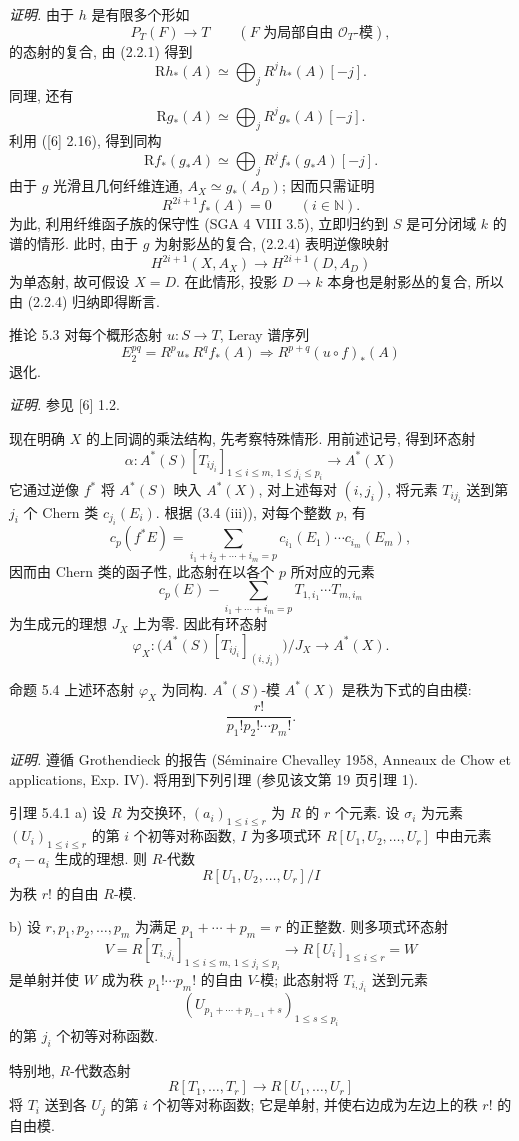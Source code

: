\emph{证明.} 由于 $h$ 是有限多个形如
\[
P_T(F)\to T\qquad(F\text{ 为局部自由 }\mathcal O_T\text{-模}),
\tag{Q}
\]
的态射的复合, 由 (2.2.1) 得到
\[
\mathrm Rh_*(A)\simeq\bigoplus_j R^jh_*(A)[-j].
\]
同理, 还有
\[
\mathrm Rg_*(A)\simeq\bigoplus_j R^jg_*(A)[-j].
\]
利用 ([6] 2.16), 得到同构
\[
\mathrm Rf_*(g_*A)\simeq\bigoplus_j R^j f_*(g_*A)[-j].
\]
由于 $g$ 光滑且几何纤维连通, $A_X\simeq g_*(A_D)$; 因而只需证明
\[
R^{2i+1}f_*(A)=0\qquad (i\in\mathbb N).
\tag{5.2.1}
\]
为此, 利用纤维函子族的保守性 (SGA 4 VIII 3.5), 立即归约到 $S$ 是可分闭域 $k$ 的谱的情形. 此时, 由于 $g$ 为射影丛的复合, (2.2.4) 表明逆像映射
\[
H^{2i+1}(X,A_X)\to H^{2i+1}(D,A_D)
\]
为单态射, 故可假设 $X=D$. 在此情形, 投影 $D\to k$ 本身也是射影丛的复合, 所以由 (2.2.4) 归纳即得断言.

\begin{statement}{推论 5.3}
对每个概形态射 $u:S\to T$, Leray 谱序列
\[
E_2^{pq}=R^p u_*\,R^q f_*(A)\Rightarrow R^{p+q}(u\circ f)_*(A)
\]
退化.
\end{statement}

\emph{证明.} 参见 [6] 1.2.

现在明确 $X$ 的上同调的乘法结构, 先考察特殊情形. 用前述记号, 得到环态射
\[
\alpha:A^*(S)[T_{ij_i}]_{1\le i\le m,\,1\le j_i\le p_i}\to A^*(X)
\]
它通过逆像 $f^*$ 将 $A^*(S)$ 映入 $A^*(X)$, 对上述每对 $(i,j_i)$, 将元素 $T_{ij_i}$ 送到第 $j_i$ 个 Chern 类 $c_{j_i}(E_i)$. 根据 (3.4 (iii)), 对每个整数 $p$, 有
\[
c_p(f^*E)=\sum_{i_1+i_2+\cdots+i_m=p}c_{i_1}(E_1)\cdots c_{i_m}(E_m),
\]
因而由 Chern 类的函子性, 此态射在以各个 $p$ 所对应的元素
\[
c_p(E)-\sum_{i_1+\cdots+i_m=p}T_{1,i_1}\cdots T_{m,i_m}
\]
为生成元的理想 $J_X$ 上为零. 因此有环态射
\[
\varphi_X:\bigl(A^*(S)[T_{ij_i}]_{(i,j_i)}\bigr)/J_X\to A^*(X).
\]

\begin{statement}{命题 5.4}
上述环态射 $\varphi_X$ 为同构. $A^*(S)$-模 $A^*(X)$ 是秩为下式的自由模:
\[
\frac{r!}{p_1!p_2!\cdots p_m!}.
\]
\end{statement}

\emph{证明.} 遵循 Grothendieck 的报告 (Séminaire Chevalley 1958, Anneaux de Chow et applications, Exp. IV). 将用到下列引理 (参见该文第 19 页引理 1).

\begin{statement}{引理 5.4.1}
a) 设 $R$ 为交换环, $(a_i)_{1\le i\le r}$ 为 $R$ 的 $r$ 个元素. 设 $\sigma_i$ 为元素 $(U_i)_{1\le i\le r}$ 的第 $i$ 个初等对称函数, $I$ 为多项式环 $R[U_1,U_2,\ldots,U_r]$ 中由元素 $\sigma_i-a_i$ 生成的理想. 则 $R$-代数
\[
R[U_1,U_2,\ldots,U_r]/I
\]
为秩 $r!$ 的自由 $R$-模.

b) 设 $r,p_1,p_2,\ldots,p_m$ 为满足 $p_1+\cdots+p_m=r$ 的正整数. 则多项式环态射
\[
V=R[T_{i,j_i}]_{1\le i\le m,\,1\le j_i\le p_i}
\longrightarrow R[U_i]_{1\le i\le r}=W
\]
是单射并使 $W$ 成为秩 $p_1!\cdots p_m!$ 的自由 $V$-模; 此态射将 $T_{i,j_i}$ 送到元素
\[
(U_{p_1+\cdots+p_{i-1}+s})_{1\le s\le p_i}
\]
的第 $j_i$ 个初等对称函数.

特别地, $R$-代数态射
\[
R[T_1,\ldots,T_r]\to R[U_1,\ldots,U_r]
\]
将 $T_i$ 送到各 $U_j$ 的第 $i$ 个初等对称函数; 它是单射, 并使右边成为左边上的秩 $r!$ 的自由模.
\end{statement}

